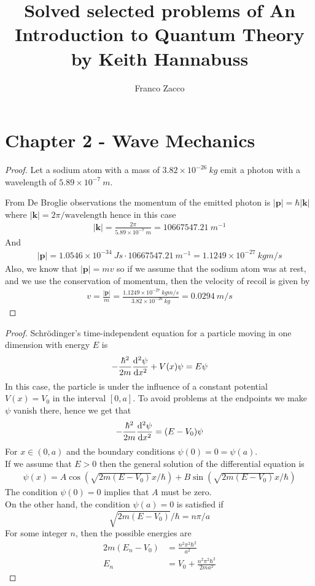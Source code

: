 \documentclass[11pt]{article}
\title{\textbf{Solved selected problems of An Introduction to Quantum Theory
by Keith Hannabuss}}
\author{Franco Zacco}
\date{}
\newcommand{\sci}[1]{\times 10^{#1}}
\theoremstyle{definition}
\begin{document}
\maketitle
\thispagestyle{empty}

\section*{Chapter 2 - Wave Mechanics}
\begin{proof}{2.1}
Let a sodium atom with a mass of $3.82\sci{-26}~kg$ emit a photon with a
wavelength of $5.89\sci{-7}~m$.

From De Broglie observations the momentum of the emitted photon is
$|\bm{p}| = \hbar |\bm{k}|$ where $|\bm{k}| = 2\pi/\text{wavelength}$ hence
in this case
\begin{align*}
    |\bm{k}| = \frac{2\pi}{5.89\sci{-7}~m} = 10667547.21~m^{-1}
\end{align*}
And 
\begin{align*}
    |\bm{p}| = 1.0546\sci{-34}~Js \cdot 10667547.21~m^{-1}
    = 1.1249\sci{-27}~kgm/s
\end{align*}
Also, we know that $|\bm{p}| = mv$ so if we assume that the sodium atom was
at rest, and we use the conservation of momentum, then the velocity of recoil
is given by 
\begin{align*}
    v = \frac{|\bm{p|}}{m} = \frac{1.1249\sci{-27}~kgm/s}{3.82\sci{-26}~kg}
    = 0.0294~m/s
\end{align*}
\end{proof}

\cleardoublepage
\begin{proof}{2.2}
Schrödinger's time-independent equation for a particle moving in one dimension
with energy $E$ is
\begin{align*}
    -\frac{\hbar^2}{2m} \dv[2]{\psi}{x} + V(x)\psi = E\psi
\end{align*}
In this case, the particle is under the influence of a constant potential
$V(x) = V_0$ in the interval $[0, a]$. To avoid problems at the endpoints
we make $\psi$ vanish there, hence we get that
\begin{align*}
    -\frac{\hbar^2}{2m} \dv[2]{\psi}{x} = (E - V_0)\psi
\end{align*}
For $x \in (0,a)$ and the boundary conditions $\psi(0) = 0 = \psi(a)$.\\
If we assume that $E > 0$ then the general solution of the differential
equation is
\begin{align*}
    \psi(x) = A\cos(\sqrt{2m(E - V_0)}x/\hbar) + B\sin(\sqrt{2m(E - V_0)}x/\hbar)
\end{align*}
The condition $\psi(0) = 0$ implies that $A$ must be zero.\\
On the other hand, the condition $\psi(a) = 0$ is satisfied if
$$\sqrt{2m(E - V_0)}/\hbar = n\pi/a$$
For some integer $n$, then the possible energies are
\begin{align*}
    2m(E_n - V_0) &= \frac{n^2\pi^2\hbar^2}{a^2}\\
    E_n &= V_0 + \frac{n^2\pi^2\hbar^2}{2m a^2}
\end{align*}
\end{proof}
\end{document}
